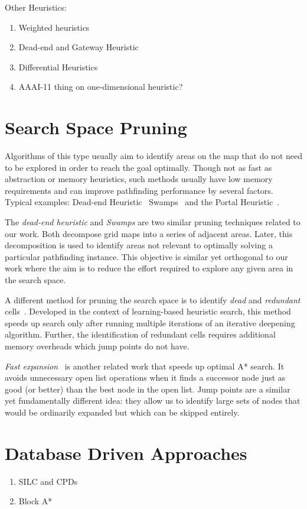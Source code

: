 Other Heuristics:
\begin{enumerate}
\item{Weighted heuristics}
\item{Dead-end and Gateway Heuristic}
\item{Differential Heuristics}
\item{AAAI-11 thing on one-dimensional heuristic?}
\end{enumerate}

\section{Search Space Pruning}
\label{cha::lit::enhancements::pruning}
Algorithms of this type usually aim to identify areas on the map that do not need to be explored in
order to reach the goal optimally. Though not as fast as abstraction or memory
heuristics, such methods usually have low memory requirements and can improve
pathfinding performance by several factors. Typical examples: Dead-end Heuristic~\cite{bjornsson06}
Swamps~\cite{pochter09} and the Portal Heuristic~\cite{goldenberg10}.

The \emph{dead-end heuristic} \cite{bjornsson06} and \emph{Swamps} \cite{pochter10}
are two similar pruning techniques related to our work.
Both decompose grid maps into a series of adjacent areas. Later, this decomposition
is used to identify areas not relevant to optimally solving a particular
pathfinding instance.
This objective is similar yet orthogonal to our work where
the aim is to reduce the effort required to explore any given area in the search
space.

A different method for pruning the search space is to identify \emph{dead} and
\emph{redundant} cells~\cite{sturtevant10b}.  Developed in the context of
learning-based heuristic search, this method speeds up search only after running
multiple iterations of an iterative deepening algorithm.  Further, the
identification of redundant cells requires additional memory overheads which
jump points do not have.

\emph{Fast expansion}~\cite{sun09} is another related work that speeds up
optimal A* search. It avoids unnecessary open list operations when it finds a
successor node just as good (or better) than the best node in the open list.
Jump points are a similar yet fundamentally different idea: they allow us to
identify large sets of nodes that would be ordinarily expanded but which can be
skipped entirely.

\section{Database Driven Approaches}
\label{cha::lit::enhancements::db}

\begin{enumerate}
\item{SILC and CPDs}
\item{Block A*}
\end{enumerate}

